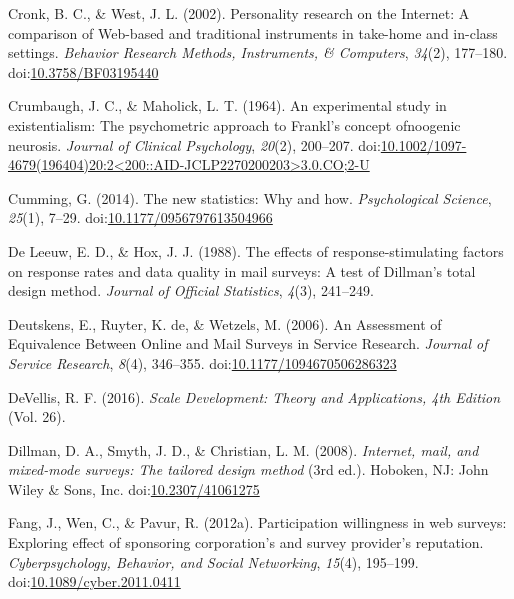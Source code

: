 \documentclass[english,man, mask]{apa6}
\theoremstyle{definition}
\theoremstyle{definition}
\theoremstyle{definition}
\theoremstyle{remark}
\begin{document}
\hypertarget{ref-Cronk2002}{}
Cronk, B. C., \& West, J. L. (2002). Personality research on the
Internet: A comparison of Web-based and traditional instruments in
take-home and in-class settings. \emph{Behavior Research Methods,
Instruments, \& Computers}, \emph{34}(2), 177--180.
doi:\href{https://doi.org/10.3758/BF03195440}{10.3758/BF03195440}

\hypertarget{ref-Crumbaugh1964}{}
Crumbaugh, J. C., \& Maholick, L. T. (1964). An experimental study in
existentialism: The psychometric approach to Frankl's concept ofnoogenic
neurosis. \emph{Journal of Clinical Psychology}, \emph{20}(2), 200--207.
doi:\href{https://doi.org/10.1002/1097-4679(196404)20:2\%3C200::AID-JCLP2270200203\%3E3.0.CO;2-U}{10.1002/1097-4679(196404)20:2\textless{}200::AID-JCLP2270200203\textgreater{}3.0.CO;2-U}

\hypertarget{ref-Cumming2014}{}
Cumming, G. (2014). The new statistics: Why and how. \emph{Psychological
Science}, \emph{25}(1), 7--29.
doi:\href{https://doi.org/10.1177/0956797613504966}{10.1177/0956797613504966}

\hypertarget{ref-DeLeeuw1988}{}
De Leeuw, E. D., \& Hox, J. J. (1988). The effects of
response-stimulating factors on response rates and data quality in mail
surveys: A test of Dillman's total design method. \emph{Journal of
Official Statistics}, \emph{4}(3), 241--249.

\hypertarget{ref-Deutskens2006}{}
Deutskens, E., Ruyter, K. de, \& Wetzels, M. (2006). An Assessment of
Equivalence Between Online and Mail Surveys in Service Research.
\emph{Journal of Service Research}, \emph{8}(4), 346--355.
doi:\href{https://doi.org/10.1177/1094670506286323}{10.1177/1094670506286323}

\hypertarget{ref-DeVellis2016a}{}
DeVellis, R. F. (2016). \emph{Scale Development: Theory and
Applications, 4th Edition} (Vol. 26).

\hypertarget{ref-Dillman2008}{}
Dillman, D. A., Smyth, J. D., \& Christian, L. M. (2008).
\emph{Internet, mail, and mixed-mode surveys: The tailored design
method} (3rd ed.). Hoboken, NJ: John Wiley \& Sons, Inc.
doi:\href{https://doi.org/10.2307/41061275}{10.2307/41061275}

\hypertarget{ref-Fang2012a}{}
Fang, J., Wen, C., \& Pavur, R. (2012a). Participation willingness in
web surveys: Exploring effect of sponsoring corporation's and survey
provider's reputation. \emph{Cyberpsychology, Behavior, and Social
Networking}, \emph{15}(4), 195--199.
doi:\href{https://doi.org/10.1089/cyber.2011.0411}{10.1089/cyber.2011.0411}
\end{document}
